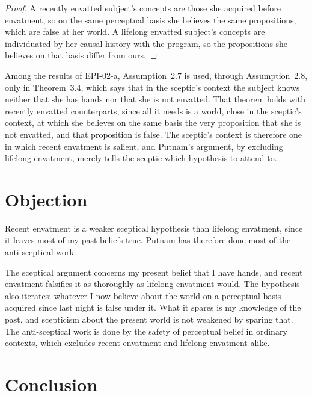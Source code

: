 \documentclass{situationist-preprint}
\begin{document}
\begin{proof}
A recently envatted subject's concepts are those she acquired before envatment, so on the same perceptual basis she believes the same propositions, which are false at her world. A lifelong envatted subject's concepts are individuated by her causal history with the program, so the propositions she believes on that basis differ from ours.
\end{proof}

Among the results of EPI-02-a, Assumption~2.7 is used, through Assumption~2.8, only in Theorem~3.4, which says that in the sceptic's context the subject knows neither that she has hands nor that she is not envatted. That theorem holds with recently envatted counterparts, since all it needs is a world, close in the sceptic's context, at which she believes on the same basis the very proposition that she is not envatted, and that proposition is false. The sceptic's context is therefore one in which recent envatment is salient, and Putnam's argument, by excluding lifelong envatment, merely tells the sceptic which hypothesis to attend to.

\section{Objection}

\begin{objection}
Recent envatment is a weaker sceptical hypothesis than lifelong envatment, since it leaves most of my past beliefs true. Putnam has therefore done most of the anti-sceptical work.
\end{objection}

\begin{reply}
The sceptical argument concerns my present belief that I have hands, and recent envatment falsifies it as thoroughly as lifelong envatment would. The hypothesis also iterates: whatever I now believe about the world on a perceptual basis acquired since last night is false under it. What it spares is my knowledge of the past, and scepticism about the present world is not weakened by sparing that. The anti-sceptical work is done by the safety of perceptual belief in ordinary contexts, which excludes recent envatment and lifelong envatment alike.
\end{reply}

\section{Conclusion}
\end{document}
